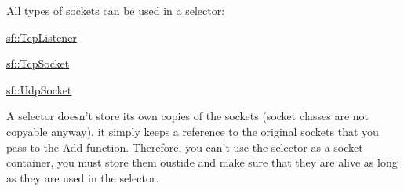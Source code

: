 All types of sockets can be used in a selector\-: \begin{DoxyItemize}
\item \hyperlink{classsf_1_1_tcp_listener}{sf\-::\-Tcp\-Listener} \item \hyperlink{classsf_1_1_tcp_socket}{sf\-::\-Tcp\-Socket} \item \hyperlink{classsf_1_1_udp_socket}{sf\-::\-Udp\-Socket}\end{DoxyItemize}
A selector doesn't store its own copies of the sockets (socket classes are not copyable anyway), it simply keeps a reference to the original sockets that you pass to the Add function. Therefore, you can't use the selector as a socket container, you must store them oustide and make sure that they are alive as long as they are used in the selector.

